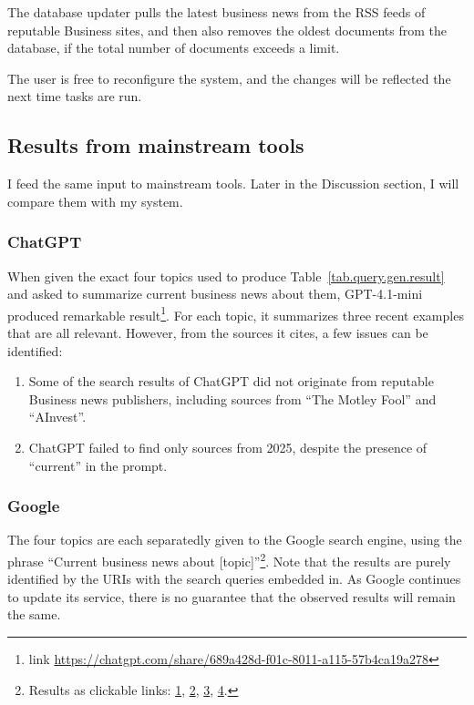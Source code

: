 \documentclass[final-report]{report-template}
\begin{document}
The database updater pulls the latest business news from the RSS feeds of
reputable Business sites, and then also removes the oldest documents from the
database, if the total number of documents exceeds a limit.

The user is free to reconfigure the system, and the changes will be reflected
the next time tasks are run.

\subsection{Results from mainstream tools}
I feed the same input to mainstream tools. Later in the Discussion section, I
will compare them with my system.

\subsubsection{ChatGPT}
When given the exact four topics used to produce
Table~\ref{tab.query.gen.result} and asked to summarize current business news
about them, GPT-4.1-mini produced remarkable result\footnote{
link \url{https://chatgpt.com/share/689a428d-f01c-8011-a115-57b4ca19a278}
}.
For each topic, it summarizes three recent examples that are all relevant.
However, from the sources it cites, a few issues can be identified:
\begin{enumerate}
	\item Some of the search results of ChatGPT did not originate from
		reputable Business news publishers, including sources from ``The Motley
		Fool'' and ``AInvest''.
	\item ChatGPT failed to find only sources from 2025, despite the presence of
		``current'' in the prompt.
\end{enumerate}

\subsubsection{Google}
The four topics are each separatedly given to the Google search engine, using
the phrase ``Current business news about [topic]''\footnote{Results as
	clickable links:
\href{https://www.google.com/search?q=Current+business+news+about+vertical+integration}{1}, 
\href{https://www.google.com/search?q=Current+business+news+about+diversification+strategies}{2}, 
\href{https://www.google.com/search?q=Current+business+news+about+competitive+advantage}{3}, 
\href{https://www.google.com/search?q=Current+business+news+about+foreign+direct+investment}{4}.
}.
Note that the results are purely identified by the URIs with the search queries
embedded in. As Google continues to update its service, there is no guarantee
that the observed results will remain the same.
\end{document}
